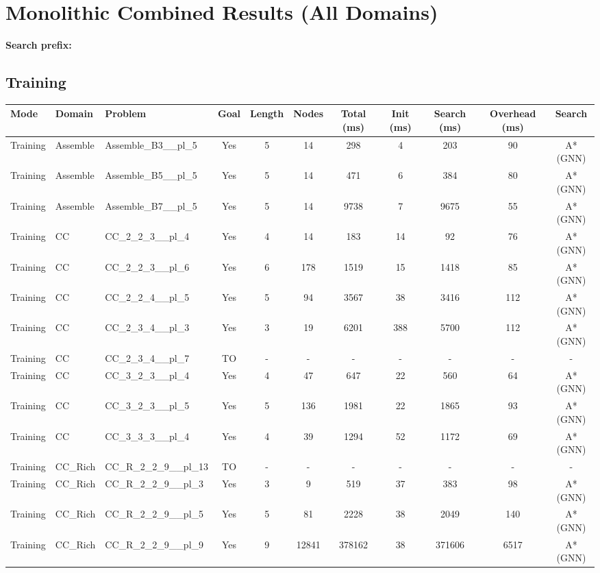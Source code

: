 \documentclass{article}
\begin{document}
\section*{Monolithic Combined Results (All Domains)}
\textbf{Search prefix:} 
\\[0.5cm]
\subsection*{Training}
\begin{tabular}{lllcccccccc}
\toprule
Mode & Domain & Problem & Goal & Length & Nodes & Total (ms) & Init (ms) & Search (ms) & Overhead (ms) & Search \\
\midrule
Training & Assemble & Assemble\_B3\_\_pl\_5 & Yes & 5 & 14 & 298 & 4 & 203 & 90 & A*(GNN) \\
Training & Assemble & Assemble\_B5\_\_pl\_5 & Yes & 5 & 14 & 471 & 6 & 384 & 80 & A*(GNN) \\
Training & Assemble & Assemble\_B7\_\_pl\_5 & Yes & 5 & 14 & 9738 & 7 & 9675 & 55 & A*(GNN) \\
Training & CC & CC\_2\_2\_3\_\_pl\_4 & Yes & 4 & 14 & 183 & 14 & 92 & 76 & A*(GNN) \\
Training & CC & CC\_2\_2\_3\_\_pl\_6 & Yes & 6 & 178 & 1519 & 15 & 1418 & 85 & A*(GNN) \\
Training & CC & CC\_2\_2\_4\_\_pl\_5 & Yes & 5 & 94 & 3567 & 38 & 3416 & 112 & A*(GNN) \\
Training & CC & CC\_2\_3\_4\_\_pl\_3 & Yes & 3 & 19 & 6201 & 388 & 5700 & 112 & A*(GNN) \\
Training & CC & CC\_2\_3\_4\_\_pl\_7 & TO & - & - & - & - & - & - & - \\
Training & CC & CC\_3\_2\_3\_\_pl\_4 & Yes & 4 & 47 & 647 & 22 & 560 & 64 & A*(GNN) \\
Training & CC & CC\_3\_2\_3\_\_pl\_5 & Yes & 5 & 136 & 1981 & 22 & 1865 & 93 & A*(GNN) \\
Training & CC & CC\_3\_3\_3\_\_pl\_4 & Yes & 4 & 39 & 1294 & 52 & 1172 & 69 & A*(GNN) \\
Training & CC\_Rich & CC\_R\_2\_2\_9\_\_pl\_13 & TO & - & - & - & - & - & - & - \\
Training & CC\_Rich & CC\_R\_2\_2\_9\_\_pl\_3 & Yes & 3 & 9 & 519 & 37 & 383 & 98 & A*(GNN) \\
Training & CC\_Rich & CC\_R\_2\_2\_9\_\_pl\_5 & Yes & 5 & 81 & 2228 & 38 & 2049 & 140 & A*(GNN) \\
Training & CC\_Rich & CC\_R\_2\_2\_9\_\_pl\_9 & Yes & 9 & 12841 & 378162 & 38 & 371606 & 6517 & A*(GNN) \\

\end{tabular}
\end{document}
